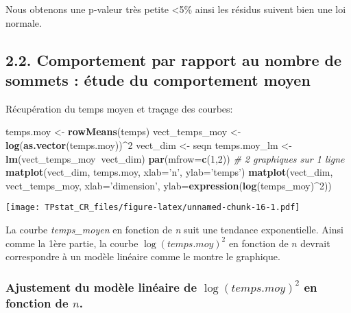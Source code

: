 \documentclass[
]{article}
\newenvironment{Shaded}{\begin{snugshade}}{\end{snugshade}}
\newcommand{\CommentTok}[1]{\textcolor[rgb]{0.56,0.35,0.01}{\textit{#1}}}
\newcommand{\DataTypeTok}[1]{\textcolor[rgb]{0.13,0.29,0.53}{#1}}
\newcommand{\DecValTok}[1]{\textcolor[rgb]{0.00,0.00,0.81}{#1}}
\newcommand{\KeywordTok}[1]{\textcolor[rgb]{0.13,0.29,0.53}{\textbf{#1}}}
\newcommand{\NormalTok}[1]{#1}
\newcommand{\OperatorTok}[1]{\textcolor[rgb]{0.81,0.36,0.00}{\textbf{#1}}}
\newcommand{\StringTok}[1]{\textcolor[rgb]{0.31,0.60,0.02}{#1}}
\begin{document}
Nous obtenons une p-valeur très petite \textless5\% ainsi les résidus
suivent bien une loi normale.

\hypertarget{comportement-par-rapport-au-nombre-de-sommets-uxe9tude-du-comportement-moyen}{%
\subsection{2.2. Comportement par rapport au nombre de sommets : étude
du comportement
moyen}\label{comportement-par-rapport-au-nombre-de-sommets-uxe9tude-du-comportement-moyen}}

Récupération du temps moyen et traçage des courbes:

\begin{Shaded}
\begin{Highlighting}[]
\NormalTok{temps.moy <-}\StringTok{ }\KeywordTok{rowMeans}\NormalTok{(temps)}
\NormalTok{vect_temps_moy <-}\StringTok{ }\KeywordTok{log}\NormalTok{(}\KeywordTok{as.vector}\NormalTok{(temps.moy))}\OperatorTok{^}\DecValTok{2}
\NormalTok{vect_dim <-}\StringTok{ }\NormalTok{seqn}
\NormalTok{temps.moy_lm <-}\StringTok{ }\KeywordTok{lm}\NormalTok{(vect_temps_moy}\OperatorTok{~}\NormalTok{vect_dim)}
\KeywordTok{par}\NormalTok{(}\DataTypeTok{mfrow=}\KeywordTok{c}\NormalTok{(}\DecValTok{1}\NormalTok{,}\DecValTok{2}\NormalTok{)) }\CommentTok{# 2 graphiques sur 1 ligne}
\KeywordTok{matplot}\NormalTok{(vect_dim, temps.moy, }\DataTypeTok{xlab=}\StringTok{'n'}\NormalTok{, }\DataTypeTok{ylab=}\StringTok{'temps'}\NormalTok{)}
\KeywordTok{matplot}\NormalTok{(vect_dim, vect_temps_moy, }\DataTypeTok{xlab=}\StringTok{'dimension'}\NormalTok{, }\DataTypeTok{ylab=}\KeywordTok{expression}\NormalTok{(}\KeywordTok{log}\NormalTok{(temps_moy)}\OperatorTok{^}\DecValTok{2}\NormalTok{))}
\end{Highlighting}
\end{Shaded}

\texttt{[image: TPstat\_CR\_files/figure-latex/unnamed-chunk-16-1.pdf]}

La courbe \emph{temps\_moyen} en fonction de \emph{n} suit une tendance
exponentielle. Ainsi comme la 1ère partie, la courbe
\(\log(temps.moy)^2\) en fonction de \(n\) devrait correspondre à un
modèle linéaire comme le montre le graphique.

\hypertarget{ajustement-du-moduxe8le-linuxe9aire-de-logtemps.moy2-en-fonction-de-n.}{%
\subsubsection{\texorpdfstring{Ajustement du modèle linéaire de
\(\log(temps.moy)^2\) en fonction de
\(n\).}{Ajustement du modèle linéaire de \textbackslash log(temps.moy)\^{}2 en fonction de n.}}\label{ajustement-du-moduxe8le-linuxe9aire-de-logtemps.moy2-en-fonction-de-n.}}
\end{document}
